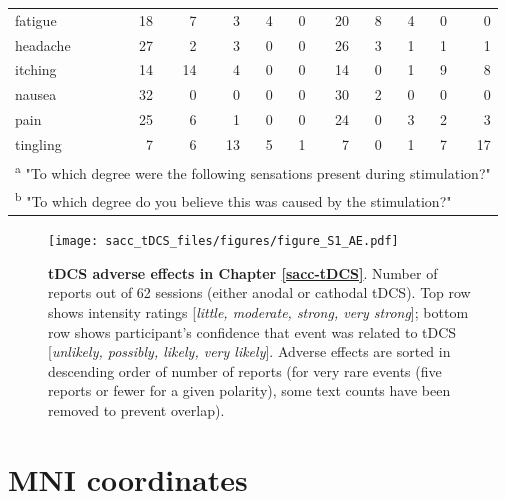 \documentclass[11pt,]{memoir}
\newcommand{\blandscape}{\begin{landscape}}
\newcommand{\elandscape}{\end{landscape}}
\def\defstyle{Ruled} %
\begin{document}
\begin{longtable}{lrrrrrrrrrr}
\hspace{1em}fatigue & 18 & 7 & 3 & 4 & 0 & 20 & 8 & 4 & 0 & 0\\
\hspace{1em}headache & 27 & 2 & 3 & 0 & 0 & 26 & 3 & 1 & 1 & 1\\
\hspace{1em}itching & 14 & 14 & 4 & 0 & 0 & 14 & 0 & 1 & 9 & 8\\
\hspace{1em}nausea & 32 & 0 & 0 & 0 & 0 & 30 & 2 & 0 & 0 & 0\\
\hspace{1em}pain & 25 & 6 & 1 & 0 & 0 & 24 & 0 & 3 & 2 & 3\\
\hspace{1em}tingling & 7 & 6 & 13 & 5 & 1 & 7 & 0 & 1 & 7 & 17\\
\bottomrule
\multicolumn{11}{l}{\textsuperscript{a} "To which degree were the following sensations present during stimulation?"}\\
\multicolumn{11}{l}{\textsuperscript{b} "To which degree do you believe this was caused by the stimulation?"}\\
\end{longtable}
\endgroup{}

\endgroup

\newpage
\pagestyle{empty}
\changetext{}{}{-25mm}{}{}
\blandscape

\begin{figure}
\centering
\texttt{[image: sacc\_tDCS\_files/figures/figure\_S1\_AE.pdf]}
\caption{\label{fig:fig-sacc-tDCS-AE}\textbf{tDCS adverse effects in Chapter \ref{sacc-tDCS}}. Number of reports out of 62 sessions (either anodal or cathodal tDCS). Top row shows intensity ratings {[}\emph{little, moderate, strong, very strong}{]}; bottom row shows participant's confidence that event was related to tDCS {[}\emph{unlikely, possibly, likely, very likely}{]}. Adverse effects are sorted in descending order of number of reports (for very rare events (five reports or fewer for a given polarity), some text counts have been removed to prevent overlap).}
\end{figure}



\newpage
\elandscape
\changetext{}{}{+25mm}{}{}
\pagestyle{\defstyle}

\hypertarget{mni-coordinates}{%
\section{MNI coordinates}\label{mni-coordinates}}
\end{document}
